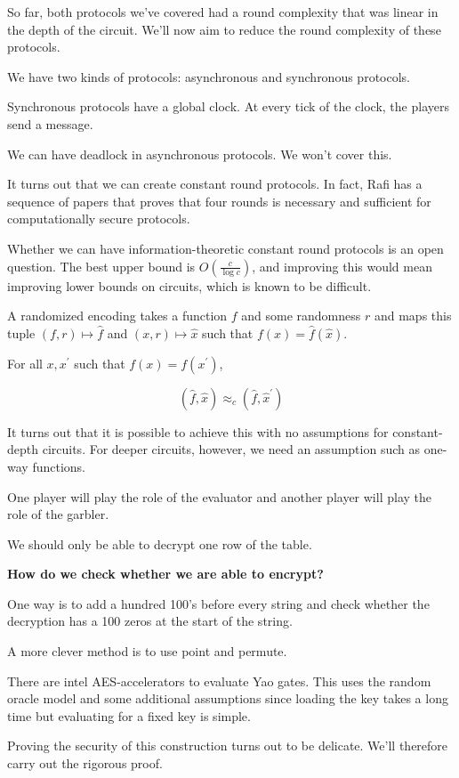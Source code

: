 \documentclass{article}
\theoremstyle{definition}
\begin{document}
So far, both protocols we've covered had a round complexity that was linear in the depth of the circuit. We'll now aim to reduce the round complexity of these protocols.

We have two kinds of protocols: asynchronous and synchronous protocols.

Synchronous protocols have a global clock. At every tick of the clock, the players send a message.

We can have deadlock in asynchronous protocols. We won't cover this.

It turns out that we can create constant round protocols. In fact, Rafi has a sequence of papers that proves that four rounds is necessary and sufficient for computationally secure protocols.

Whether we can have information-theoretic constant round protocols is an open question. The best upper bound is $O(\frac{c}{\log c})$, and improving this would mean improving lower bounds on circuits, which is known to be difficult.

A randomized encoding takes a function $f$ and some randomness $r$ and maps this tuple $(f,r) \mapsto \hat{f}$ and $(x,r) \mapsto \hat{x}$ such that $f(x) = \hat{f}(\hat{x})$.

For all $x,x^{\prime}$ such that $f(x) = f(x^{\prime})$, 

\[ (\hat{f}, \hat{x}) \approx_{c} (\hat{f}, \hat{x}^{\prime})\]

It turns out that it is possible to achieve this with no assumptions for constant-depth circuits. For deeper circuits, however, we need an assumption such as one-way functions.

One player will play the role of the evaluator and another player will play the role of the garbler.

We should only be able to decrypt one row of the table.

\textbf{How do we check whether we are able to encrypt?}

One way is to add a hundred 100's before every string and check whether the decryption has a 100 zeros at the start of the string.

A more clever method is to use point and permute.

There are intel AES-accelerators to evaluate Yao gates. This uses the random oracle model and some additional assumptions since loading the key takes a long time but evaluating for a fixed key is simple.

Proving the security of this construction turns out to be delicate. We'll therefore carry out the rigorous proof.
\end{document}
